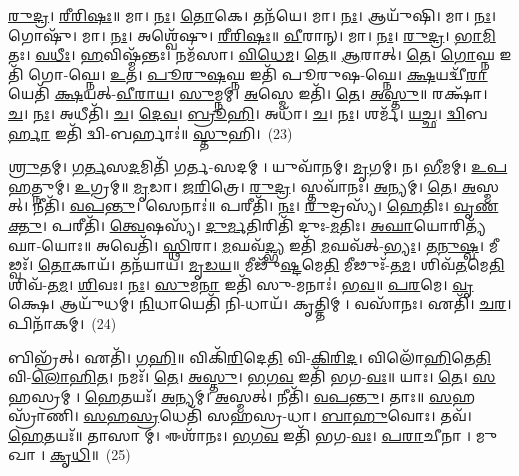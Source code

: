 \-\ul{𑌰𑍁}\-\-\ul{𑌦𑍍𑌰}\-। \ul{𑌰𑍀}\-\-\ul{𑌰𑌿}\-\-\ul{𑌷𑌃}\-॥ 
𑌮𑌾। \ul{𑌨𑌃}\-। \ul{𑌤𑍋}\-𑌕𑍇। 𑌤𑌨᳴𑌯𑍇। 𑌮𑌾। \ul{𑌨𑌃}\-। 𑌆𑌯𑍁᳴𑌷𑌿। 𑌮𑌾। \ul{𑌨𑌃}\-। 𑌗𑍋𑌷𑍁᳴। 𑌮𑌾। \ul{𑌨𑌃}\-। 𑌅𑌶𑍍𑌵𑍇᳴𑌷𑍁। \ul{𑌰𑍀}\-\-\ul{𑌰𑌿}\-\-\ul{𑌷𑌃}\-॥ 
\-\ul{𑌵𑍀}\-𑌰𑌾𑌨𑍍। 𑌮𑌾। \ul{𑌨𑌃}\-। \ul{𑌰𑍁}\-\-\ul{𑌦𑍍𑌰}\-। \ul{𑌭𑌾}\-\-\ul{𑌮𑌿}\-𑌤𑌃। \ul{𑌵}\-\-\ul{𑌧𑍀𑌃}\-। \ul{𑌹}\-𑌵𑌿𑌷𑍍𑌮᳴𑌨𑍍𑌤𑌃। 𑌨𑌮᳴𑌸𑌾। \ul{𑌵𑌿}\-\-\ul{𑌧𑍇}\-\-\ul{𑌮}\-। \ul{𑌤𑍇}\-॥ 
\-\ul{𑌆}\-𑌰𑌾𑌤𑍍। \ul{𑌤𑍇}\-। \ul{𑌗𑍋}\-𑌘𑍍𑌨 𑌇𑌤𑌿᳴ 𑌗𑍋-𑌘𑍍𑌨𑍇। \ul{𑌉}\-𑌤। \ul{𑌪𑍂}\-\-\ul{𑌰𑍁}\-\-\ul{𑌷}\-𑌘𑍍𑌨 𑌇𑌤𑌿᳴ 𑌪𑍂𑌰𑍁𑌷-𑌘𑍍𑌨𑍇। \ul{𑌕𑍍𑌷}\-𑌯𑌦𑍍𑌵𑍀᳴\-\ul{𑌰𑌾}\-𑌯𑍇𑌤𑌿᳴ \ul{𑌕𑍍𑌷}\-𑌯𑌤𑍍-\-\ul{𑌵𑍀}\-\-\ul{𑌰𑌾}\-\-\ul{𑌯}\-। \ul{𑌸𑍁}\-𑌮𑍍𑌨𑌮𑍍। \ul{𑌅}\-𑌸𑍍𑌮𑍇 𑌇𑌤𑌿᳴। \ul{𑌤𑍇}\-। \ul{𑌅}\-\-\ul{𑌸𑍍𑌤𑍁}\-॥ 
𑌰𑌕𑍍𑌷𑌾᳴। \ul{𑌚}\-। \ul{𑌨𑌃}\-। 𑌅𑌧𑍀𑌤𑌿᳴। \ul{𑌚}\-। \ul{𑌦𑍇}\-\-\ul{𑌵}\-। \ul{𑌬𑍍𑌰𑍂}\-\-\ul{𑌹𑌿}\-। 𑌅𑌧𑌾᳴। \ul{𑌚}\-। \ul{𑌨𑌃}\-। 𑌶𑌰𑍍𑌮᳴। \ul{𑌯}\-\-\ul{𑌚𑍍𑌛}\-। \ul{𑌦𑍍𑌵𑌿}\-𑌬\-\ul{𑌰𑍍𑌹𑌾} 𑌇𑌤𑌿᳴ 𑌦𑍍𑌵𑌿-𑌬𑌰𑍍𑌹𑌾𑌃॑॥ 
\-\ul{𑌸𑍍𑌤𑍁}\-𑌹𑌿।~(23)


\-\ul{𑌶𑍍𑌰𑍁}\-𑌤𑌮𑍍। \ul{𑌗}\-\-\ul{𑌰𑍍𑌤}\-𑌸\-\ul{𑌦}\-𑌮𑌿𑌤𑌿᳴ 𑌗𑌰𑍍𑌤-𑌸𑌦𑌮𑍍। 𑌯𑍁𑌵𑌾᳴𑌨𑌮𑍍। \ul{𑌮𑍃}\-𑌗𑌮𑍍। 𑌨। \ul{𑌭𑍀}\-𑌮𑌮𑍍। \ul{𑌉}\-\-\ul{𑌪}\-\-\ul{𑌹}\-𑌤𑍍𑌨𑍁𑌮𑍍। \ul{𑌉}\-𑌗𑍍𑌰𑌮𑍍॥ 
\-\ul{𑌮𑍃}\-𑌡𑌾। \ul{𑌜}\-\-\ul{𑌰𑌿}\-𑌤𑍍𑌰𑍇। \ul{𑌰𑍁}\-\-\ul{𑌦𑍍𑌰}\-। 𑌸𑍍𑌤𑌵𑌾᳴𑌨𑌃। \ul{𑌅}\-𑌨𑍍𑌯𑌮𑍍। \ul{𑌤𑍇}\-। \ul{𑌅}\-𑌸𑍍𑌮𑌤𑍍। 𑌨𑍀𑌤𑌿᳴। \ul{𑌵}\-\-\ul{𑌪}\-\-\ul{𑌨𑍍𑌤𑍁}\-। 𑌸𑍇𑌨𑌾𑌃॑॥ 
𑌪𑌰𑍀𑌤𑌿᳴। \ul{𑌨𑌃}\-। \ul{𑌰𑍁}\-𑌦𑍍𑌰𑌸𑍍𑌯᳴। \ul{𑌹𑍇}\-𑌤𑌿𑌃। \ul{𑌵𑍃}\-\-\ul{𑌣}\-\-\ul{𑌕𑍍𑌤𑍁}\-। 𑌪𑌰𑍀𑌤𑌿᳴। \ul{𑌤𑍍𑌵𑍇}\-𑌷𑌸𑍍𑌯᳴। \ul{𑌦𑍁}\-\-\ul{𑌰𑍍𑌮}\-𑌤𑌿𑌰𑌿𑌤𑌿᳴ 𑌦𑍁𑌃-\-\ul{𑌮}\-𑌤𑌿𑌃। \ul{𑌅}\-\-\ul{𑌘𑌾}\-𑌯𑍋𑌰𑌿𑌤𑍍𑌯᳴𑌘𑌾-𑌯𑍋𑌃॥ 
𑌅𑌵𑍇𑌤𑌿᳴। \ul{𑌸𑍍𑌥𑌿}\-𑌰𑌾। \ul{𑌮}\-𑌘𑌵᳴\-\ul{𑌦𑍍𑌭𑍍𑌯} 𑌇𑌤𑌿᳴ \ul{𑌮}\-𑌘𑌵᳴𑌤𑍍-\-\ul{𑌭𑍍𑌯𑌃}\-। \ul{𑌤}\-\-\ul{𑌨𑍁}\-\-\ul{𑌷𑍍𑌵}\-। 𑌮𑍀𑌢𑍍𑌵𑌃᳴। \ul{𑌤𑍋}\-𑌕𑌾𑌯᳴। 𑌤𑌨᳴𑌯𑌾𑌯। \ul{𑌮𑍃}\-\-\ul{𑌡}\-\-\ul{𑌯}\-॥ 
𑌮𑍀𑌢𑍁᳴\-\ul{𑌷𑍍𑌟}\-𑌮𑍇\-\ul{𑌤𑌿} 𑌮𑍀𑌢𑍁𑌃᳴-\-\ul{𑌤}\-\-\ul{𑌮}\-। 𑌶𑌿𑌵᳴\-\ul{𑌤}\-𑌮𑍇\-\ul{𑌤𑌿} 𑌶𑌿𑌵᳴-\-\ul{𑌤}\-\-\ul{𑌮}\-। \ul{𑌶𑌿}\-𑌵𑌃। \ul{𑌨𑌃}\-। \ul{𑌸𑍁}\-𑌮\-\ul{𑌨𑌾} 𑌇𑌤𑌿᳴ 𑌸𑍁-𑌮𑌨𑌾𑌃॑। \ul{𑌭}\-\-\ul{𑌵}\-॥ 
\-\ul{𑌪}\-\-\ul{𑌰}\-𑌮𑍇। \ul{𑌵𑍃}\-𑌕𑍍𑌷𑍇। 𑌆𑌯𑍁᳴𑌧𑌮𑍍। \ul{𑌨𑌿}\-𑌧𑌾𑌯𑍇𑌤𑌿᳴ 𑌨𑌿-𑌧𑌾𑌯᳴। 𑌕𑍃𑌤𑍍𑌤𑌿𑌮𑍍। 𑌵𑌸𑌾᳴𑌨𑌃। 𑌏𑌤𑌿᳴। \ul{𑌚}\-\-\ul{𑌰}\-। 𑌪𑌿𑌨𑌾᳴𑌕𑌮𑍍।~(24)


𑌬𑌿𑌭𑍍𑌰᳴𑌤𑍍। 𑌏𑌤𑌿᳴। \ul{𑌗}\-\-\ul{𑌹𑌿}\-॥ 
𑌵𑌿𑌕𑌿᳴\-\ul{𑌰𑌿}\-𑌦𑍇\-\ul{𑌤𑌿} 𑌵𑌿-\-\ul{𑌕𑌿}\-\-\ul{𑌰𑌿}\-\-\ul{𑌦}\-। 𑌵𑌿𑌲𑍋᳴\-\ul{𑌹𑌿}\-𑌤𑍇\-\ul{𑌤𑌿} 𑌵𑌿-\-\ul{𑌲𑍋}\-\-\ul{𑌹𑌿}\-\-\ul{𑌤}\-। 𑌨𑌮𑌃᳴। \ul{𑌤𑍇}\-। \ul{𑌅}\-\-\ul{𑌸𑍍𑌤𑍁}\-। \ul{𑌭}\-\-\ul{𑌗}\-\-\ul{𑌵} 𑌇𑌤𑌿᳴ 𑌭𑌗-\-\ul{𑌵𑌃}\-॥ 
𑌯𑌾𑌃। \ul{𑌤𑍇}\-। \ul{𑌸}\-𑌹𑌸𑍍𑌰𑌮𑍍। \ul{𑌹𑍇}\-𑌤𑌯𑌃᳴। \ul{𑌅}\-𑌨𑍍𑌯𑌮𑍍। \ul{𑌅}\-𑌸𑍍𑌮𑌤𑍍। 𑌨𑍀𑌤𑌿᳴। \ul{𑌵}\-\-\ul{𑌪}\-\-\ul{𑌨𑍍𑌤𑍁}\-। 𑌤𑌾𑌃॥ 
\-\ul{𑌸}\-𑌹𑌸𑍍𑌰𑌾᳴𑌣𑌿। \ul{𑌸}\-\-\ul{𑌹}\-\-\ul{𑌸𑍍𑌰}\-𑌧𑍇𑌤𑌿᳴ 𑌸𑌹𑌸𑍍𑌰-𑌧𑌾। \ul{𑌬𑌾}\-\-\ul{𑌹𑍁}\-𑌵𑍋𑌃। 𑌤𑌵᳴। \ul{𑌹𑍇}\-𑌤𑌯𑌃᳴॥ 
𑌤𑌾𑌸𑌾𑌮𑍍। 𑌈𑌶𑌾᳴𑌨𑌃। \ul{𑌭}\-\-\ul{𑌗}\-\-\ul{𑌵} 𑌇𑌤𑌿᳴ 𑌭𑌗-\-\ul{𑌵𑌃}\-। \ul{𑌪}\-\-\ul{𑌰𑌾}\-𑌚𑍀𑌨𑌾। 𑌮𑍁𑌖𑌾। \ul{𑌕𑍃}\-\-\ul{𑌧𑌿}\-॥~(25)


